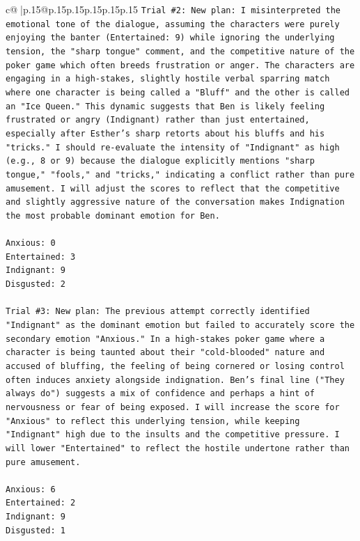 \documentclass{article}
\begin{document}
{\begin{supertabular}{c@{$\;$}|p{.15\linewidth}@{}p{.15\linewidth}p{.15\linewidth}p{.15\linewidth}p{.15\linewidth}p{.15\linewidth}}
{{{\texttt{Trial \#2: New plan: I misinterpreted the emotional tone of the dialogue, assuming the characters were purely enjoying the banter (Entertained: 9) while ignoring the underlying tension, the "sharp tongue" comment, and the competitive nature of the poker game which often breeds frustration or anger. The characters are engaging in a high{-}stakes, slightly hostile verbal sparring match where one character is being called a "Bluff" and the other is called an "Ice Queen." This dynamic suggests that Ben is likely feeling frustrated or angry (Indignant) rather than just entertained, especially after Esther's sharp retorts about his bluffs and his "tricks." I should re{-}evaluate the intensity of "Indignant" as high (e.g., 8 or 9) because the dialogue explicitly mentions "sharp tongue," "fools," and "tricks," indicating a conflict rather than pure amusement. I will adjust the scores to reflect that the competitive and slightly aggressive nature of the conversation makes Indignation the most probable dominant emotion for Ben.} \\
\\ 
\texttt{Anxious: 0} \\
\texttt{Entertained: 3} \\
\texttt{Indignant: 9} \\
\texttt{Disgusted: 2} \\
\\ 
\texttt{Trial \#3: New plan: The previous attempt correctly identified "Indignant" as the dominant emotion but failed to accurately score the secondary emotion "Anxious." In a high{-}stakes poker game where a character is being taunted about their "cold{-}blooded" nature and accused of bluffing, the feeling of being cornered or losing control often induces anxiety alongside indignation. Ben's final line ("They always do") suggests a mix of confidence and perhaps a hint of nervousness or fear of being exposed. I will increase the score for "Anxious" to reflect this underlying tension, while keeping "Indignant" high due to the insults and the competitive pressure. I will lower "Entertained" to reflect the hostile undertone rather than pure amusement.} \\
\\ 
\texttt{Anxious: 6} \\
\texttt{Entertained: 2} \\
\texttt{Indignant: 9} \\
\texttt{Disgusted: 1} \\
\\ 
\\ 
}}}
\end{supertabular}}
\end{document}

